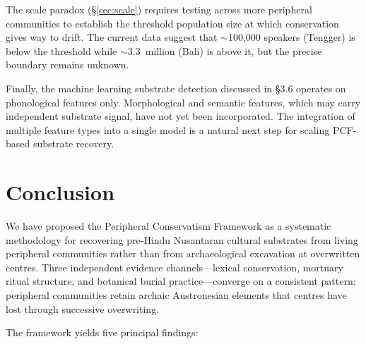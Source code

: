 \documentclass[12pt,a4paper]{article}
\begin{document}
The scale paradox (\S\ref{sec:scale}) requires testing across more peripheral communities to establish the threshold population size at which conservation gives way to drift. The current data suggest that $\sim$100,000 speakers (Tengger) is below the threshold while $\sim$3.3~million (Bali) is above it, but the precise boundary remains unknown.

Finally, the machine learning substrate detection discussed in \S3.6 operates on phonological features only. Morphological and semantic features, which may carry independent substrate signal, have not yet been incorporated. The integration of multiple feature types into a single model is a natural next step for scaling PCF-based substrate recovery.

\section{Conclusion}

We have proposed the Peripheral Conservatism Framework as a systematic methodology for recovering pre-Hindu Nusantaran cultural substrates from living peripheral communities rather than from archaeological excavation at overwritten centres. Three independent evidence channels---lexical conservation, mortuary ritual structure, and botanical burial practice---converge on a consistent pattern: peripheral communities retain archaic Austronesian elements that centres have lost through successive overwriting.

The framework yields five principal findings:
\end{document}
